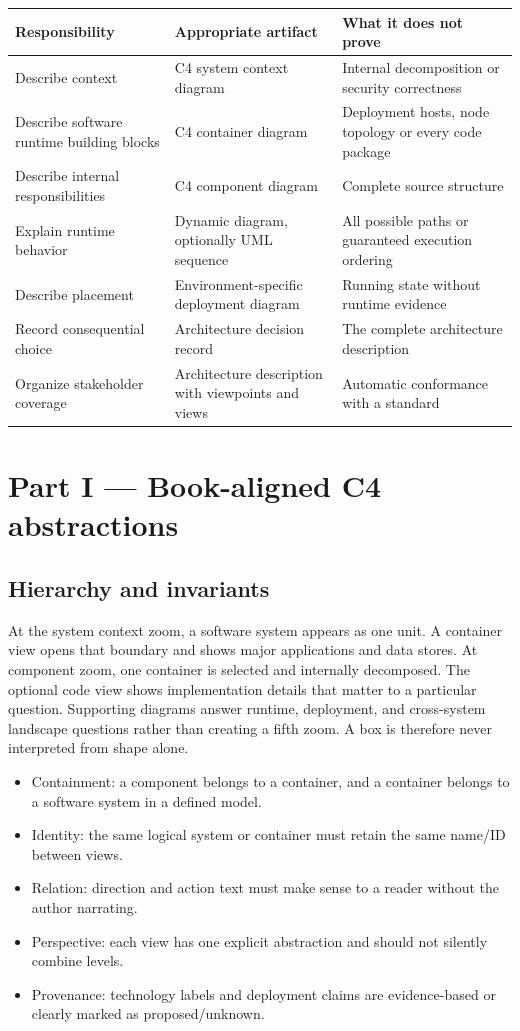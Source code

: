 \documentclass[10pt,letterpaper]{article}
\begin{document}
\begin{tabularx}{\linewidth}{@{}YYY@{}}\toprule
\textbf{Responsibility} & \textbf{Appropriate artifact} & \textbf{What it does not prove} \\ \midrule
Describe context & C4 system context diagram & Internal decomposition or security correctness \\
Describe software runtime building blocks & C4 container diagram & Deployment hosts, node topology or every code package \\
Describe internal responsibilities & C4 component diagram & Complete source structure \\
Explain runtime behavior & Dynamic diagram, optionally UML sequence & All possible paths or guaranteed execution ordering \\
Describe placement & Environment-specific deployment diagram & Running state without runtime evidence \\
Record consequential choice & Architecture decision record & The complete architecture description \\
Organize stakeholder coverage & Architecture description with viewpoints and views & Automatic conformance with a standard \\
\bottomrule\end{tabularx}

\section{Part I — Book-aligned C4 abstractions}
\subsection{Hierarchy and invariants}
At the system context zoom, a software system appears as one unit. A container view opens that boundary and shows major applications and data stores. At component zoom, one container is selected and internally decomposed. The optional code view shows implementation details that matter to a particular question. Supporting diagrams answer runtime, deployment, and cross-system landscape questions rather than creating a fifth zoom. A box is therefore never interpreted from shape alone.

\begin{itemize}
\item Containment: a component belongs to a container, and a container belongs to a software system in a defined model.
\item Identity: the same logical system or container must retain the same name/ID between views.
\item Relation: direction and action text must make sense to a reader without the author narrating.
\item Perspective: each view has one explicit abstraction and should not silently combine levels.
\item Provenance: technology labels and deployment claims are evidence-based or clearly marked as proposed/unknown.
\end{itemize}
\end{document}
